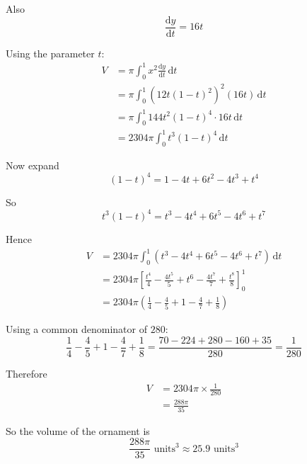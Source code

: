 \documentclass[leqno]{article}
\begin{document}
\begin{enumerate}[
  label=\textbf{\arabic*.},
  leftmargin=*,
  topsep=0pt,
  partopsep=0pt,
  parsep=0pt
]
\begin{djsSolution}
Also
\[
\frac{\mathrm{d}y}{\mathrm{d}t}=16t
\]

Using the parameter $t$:
\begin{align*}
V&=\pi\int_0^1 x^2\frac{\mathrm{d}y}{\mathrm{d}t}\,\mathrm{d}t\\
&=\pi\int_0^1 \left(12t(1-t)^2\right)^2(16t)\,\mathrm{d}t\\
&=\pi\int_0^1 144t^2(1-t)^4\cdot 16t\,\mathrm{d}t\\
&=2304\pi\int_0^1 t^3(1-t)^4\,\mathrm{d}t
\end{align*}

Now expand
\[
(1-t)^4=1-4t+6t^2-4t^3+t^4
\]

So
\[
t^3(1-t)^4=t^3-4t^4+6t^5-4t^6+t^7
\]

Hence
\begin{align*}
V&=2304\pi\int_0^1 \left(t^3-4t^4+6t^5-4t^6+t^7\right)\,\mathrm{d}t\\
&=2304\pi\left[\frac{t^4}{4}-\frac{4t^5}{5}+t^6-\frac{4t^7}{7}+\frac{t^8}{8}\right]_0^1\\
&=2304\pi\left(\frac14-\frac45+1-\frac47+\frac18\right)
\end{align*}

Using a common denominator of $280$:
\[
\frac14-\frac45+1-\frac47+\frac18=\frac{70-224+280-160+35}{280}=\frac{1}{280}
\]

Therefore
\begin{align*}
V&=2304\pi\times\frac{1}{280}\\
&=\frac{288\pi}{35}
\end{align*}

So the volume of the ornament is
\[
\frac{288\pi}{35}\text{ units}^3\approx 25.9\text{ units}^3
\]
\end{djsSolution}
\newpage

\questionitem

\begin{figure}[H]
    \centering
{}
\end{figure}
\end{enumerate}
\end{document}
